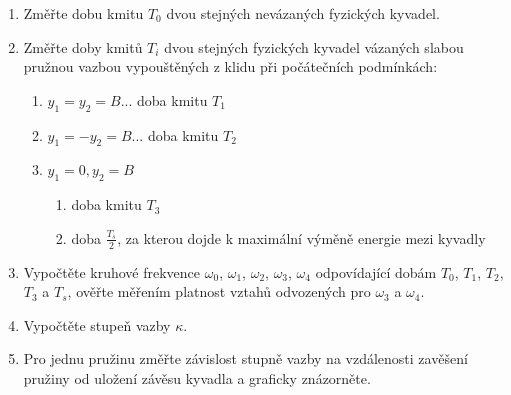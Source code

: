 \documentclass[protokol.tex]{subfiles}
\begin{document}
\begin{enumerate}
\item Změřte dobu kmitu $T_0$ dvou stejných nevázaných fyzických kyvadel.
\item Změřte doby kmitů $T_i$ dvou stejných fyzických kyvadel vázaných slabou pružnou vazbou vypouštěných z klidu při počátečních podmínkách:
\begin{enumerate}
\item $y_1 = y_2 = B$... doba kmitu $T_1$
\item $y_1 = -y_2 = B$... doba kmitu $T_2$
\item $y_1 = 0, y_2 = B$
\begin{enumerate}
\item doba kmitu $T_3$
\item doba $\frac{T_s}{2}$, za kterou dojde k maximální výměně energie mezi kyvadly
\end{enumerate}
\end{enumerate}
\item Vypočtěte kruhové frekvence $\omega_0$, $\omega_1$, $\omega_2$, $\omega_3$, $\omega_4$ odpovídající dobám $T_0$, $T_1$, $T_2$, $T_3$ a $T_s$, ověřte měřením platnost vztahů odvozených pro $\omega_3$ a $\omega_4$.
\item Vypočtěte stupeň vazby $\kappa$.
\item Pro jednu pružinu změřte závislost stupně vazby na vzdálenosti zavěšení pružiny od uložení závěsu kyvadla a graficky znázorněte.
\end{enumerate}
\end{document}
